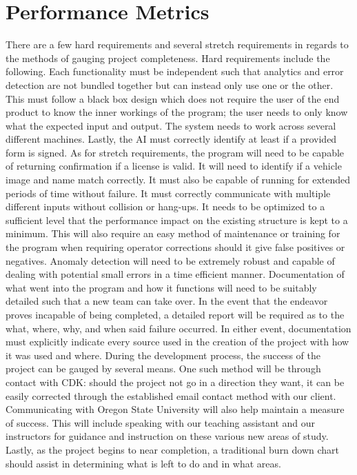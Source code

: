 \documentclass[onecolumn, draftclsnofoot,10pt, compsoc]{IEEEtran}
\begin{document}
\section{Performance Metrics}
	
	There are a few hard requirements and several stretch requirements in regards to the methods of gauging project completeness. Hard requirements include the following. Each functionality must be independent such that analytics and error detection are not bundled together but can instead only use one or the other. This must follow a black box design which does not require the user of the end product to know the inner workings of the program; the user needs to only know what the expected input and output. The system needs to work across several different machines. Lastly, the AI must correctly identify at least if a provided form is signed. As for stretch requirements, the program will need to be capable of returning confirmation if a license is valid. It will need to identify if a vehicle image and name match correctly. It must also be capable of running for extended periods of time without failure. It must correctly communicate with multiple different inputs without collision or hang-ups. It needs to be optimized to a sufficient level that the performance impact on the existing structure is kept to a minimum. This will also require an easy method of maintenance or training for the program when requiring operator corrections should it give false positives or negatives. Anomaly detection will need to be extremely robust and capable of dealing with potential small errors in a time efficient manner. Documentation of what went into the program and how it functions will need to be suitably detailed such that a new team can take over. In the event that the endeavor proves incapable of being completed, a detailed report will be required as to the what, where, why, and when said failure occurred. In either event, documentation must explicitly indicate every source used in the creation of the project with how it was used and where. During the development process, the success of the project can be gauged by several means. One such method will be through contact with CDK: should the project not go in a direction they want, it can be easily corrected through the established email contact method with our client. Communicating with Oregon State University will also help maintain a measure of success. This will include speaking with our teaching assistant and our instructors for guidance and instruction on these various new areas of study. Lastly, as the project begins to near completion, a traditional burn down chart should assist in determining what is left to do and in what areas.
	
\end{document}
